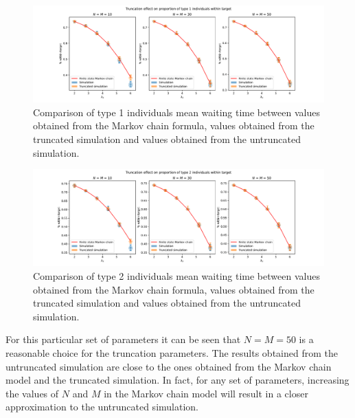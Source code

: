\begin{figure}[H]
    \includegraphics[width=\textwidth]{chapters/03_queueing_model/Bin/numeric_results_and_timings/truncation_effect/proportion_type_1.pdf}
    \caption{
        Comparison of type 1 individuals mean waiting time between values
        obtained from the Markov chain formula, values obtained from the
        truncated simulation and values obtained from the untruncated
        simulation.
    }
    \label{fig:markov_vs_des_proportion_within_time_comparison_type_1}
\end{figure}

\begin{figure}[H]
    \includegraphics[width=\textwidth]{chapters/03_queueing_model/Bin/numeric_results_and_timings/truncation_effect/proportion_type_2.pdf}
    \caption{
        Comparison of type 2 individuals mean waiting time between values
        obtained from the Markov chain formula, values obtained from the
        truncated simulation and values obtained from the untruncated
        simulation.
    }
    \label{fig:markov_vs_des_proportion_within_time_comparison_type_2}
\end{figure}

For this particular set of parameters it can be seen that \(N=M=50\) is a
reasonable choice for the truncation parameters.
The results obtained from the untruncated simulation are close to the ones
obtained from the Markov chain model and the truncated simulation.
In fact, for any set of parameters, increasing the values of \(N\) and \(M\) in
the Markov chain model will result in a closer approximation to the untruncated
simulation.

